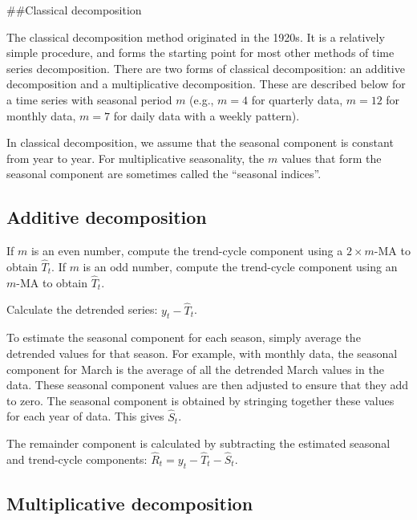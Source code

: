 \documentclass[]{book}
\providecommand{\tightlist}{%
  \setlength{\itemsep}{0pt}\setlength{\parskip}{0pt}}
\begin{document}
\#\#Classical decomposition

The classical decomposition method originated in the 1920s. It is a relatively simple procedure, and forms the starting point for most other methods of time series decomposition. There are two forms of classical decomposition: an additive decomposition and a multiplicative decomposition. These are described below for a time series with seasonal period \(m\) (e.g., \(m=4\) for quarterly data, \(m=12\) for monthly data, \(m=7\) for daily data with a weekly pattern).

In classical decomposition, we assume that the seasonal component is constant from year to year. For multiplicative seasonality, the \(m\) values that form the seasonal component are sometimes called the ``seasonal indices''.

\hypertarget{additive-decomposition}{%
\subsection*{Additive decomposition}\label{additive-decomposition}}

\begin{description}
\tightlist
\item[Step 1]
If \(m\) is an even number, compute the trend-cycle component using a \(2\times m\)-MA to obtain \(\hat{T}_t\). If \(m\) is an odd number, compute the trend-cycle component using an \(m\)-MA to obtain \(\hat{T}_t\).
\item[Step 2]
Calculate the detrended series: \(y_t - \hat{T}_t\).
\item[Step 3]
To estimate the seasonal component for each season, simply average the detrended values for that season. For example, with monthly data, the seasonal component for March is the average of all the detrended March values in the data. These seasonal component values are then adjusted to ensure that they add to zero. The seasonal component is obtained by stringing together these values for each year of data. This gives \(\hat{S}_t\).
\item[Step 4]
The remainder component is calculated by subtracting the estimated seasonal and trend-cycle components: \(\hat{R}_t = y_t - \hat{T}_t - \hat{S}_t\).
\end{description}

\hypertarget{multiplicative-decomposition}{%
\subsection*{Multiplicative decomposition}\label{multiplicative-decomposition}}
\end{document}
